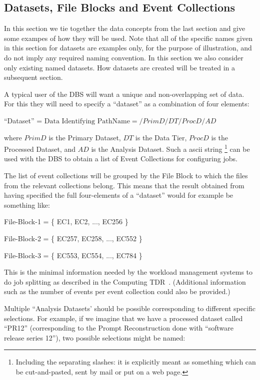 \documentclass{cmspaper}
\begin{document}
\subsection{Datasets, File Blocks and Event Collections}

  In this section we tie together the data concepts from the last section
and give some exampes of how they will be used. Note that all of the specific
names given in this section for datasets are examples only, for the purpose
of illustration, and do not imply any required naming convention. In this
section we also consider only existing named datasets. How datasets are 
created will be treated in a subsequent section.

  A typical user of the DBS will want a unique and non-overlapping set of 
data. For this they will need to specify a ``dataset'' as a combination
of four elements:
\begin{center}
  \mbox{``Dataset''} = $\mbox{Data Identifying PathName} = /PrimD/DT/ProcD/AD$
\end{center}
where $PrimD$ is the Primary Dataset, $DT$ is the Data Tier, $ProcD$ is the 
Processed Dataset, and $AD$ is the Analysis Dataset. Such a ascii string
\footnote{Including the separating slashes: it is explicitly meant as something
which can be cut-and-pasted, sent by mail or put on a web page.} can be used 
with the DBS to obtain a list of Event Collections for configuring jobs. 

  The list of event collections will be grouped by the File Block to which
the files from the relevant collections belong. This means that the result 
obtained from having specified the full four-elements of a ``dataset'' would 
for example be something like:
\begin{flushleft}
\mbox{File-Block-1} = \{ \mbox{EC1}, \mbox{EC2}, ..., EC256 \}
\end{flushleft}
\begin{flushleft}
\mbox{File-Block-2} = \{ \mbox{EC257}, \mbox{EC258}, ..., \mbox{EC552} \}
\end{flushleft}
\begin{flushleft}
\mbox{File-Block-3} = \{ \mbox{EC553}, \mbox{EC554}, ..., \mbox{EC784} \}
\end{flushleft}
This is the minimal information needed by the workload management systems to 
do job splitting as described in the Computing TDR~\cite{CTDR}. (Additional
information such as the number of events per event collection could also
be provided.)

  Multiple ``Analysis Datasets' should be possible corresponding to different
specific selections. For example, if we imagine that we have a processed
dataset called ``PR12'' (corresponding to the Prompt Reconstruction done 
with ``software release series 12''), two possible selections might be named:
\end{document}
